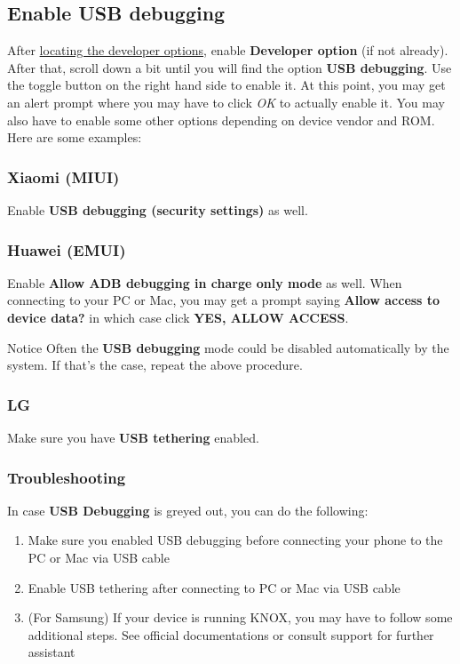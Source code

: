 \subsection{Enable USB debugging}\label{subsec:enable-usb-debugging}
After \hyperref[subsubsec:location-of-developer-options]{locating the developer options}, enable \textbf{Developer
option} (if not already). After that, scroll down a bit until you will find the option \textbf{USB debugging}. Use the
toggle button on the right hand side to enable it. At this point, you may get an alert prompt where you may have to
click \textit{OK} to actually enable it. You may also have to enable some other options depending on device vendor and
ROM. Here are some examples:

\subsubsection{Xiaomi (MIUI)}
Enable \textbf{USB debugging (security settings)} as well.

\subsubsection{Huawei (EMUI)}
Enable \textbf{Allow ADB debugging in charge only mode} as well. When connecting to your PC or Mac, you may get a prompt
saying \textbf{Allow access to device data?} in which case click \textbf{YES, ALLOW ACCESS}.

\begin{tip}{Notice}
    Often the \textbf{USB debugging} mode could be disabled automatically by the system. If that's the case, repeat the
    above procedure.
\end{tip}

\subsubsection{LG}
Make sure you have \textbf{USB tethering} enabled.

\subsubsection{Troubleshooting}
In case \textbf{USB Debugging} is greyed out, you can do the following:
\begin{enumerate}
    \item Make sure you enabled USB debugging before connecting your phone to the PC or Mac via USB cable
    \item Enable USB tethering after connecting to PC or Mac via USB cable
    \item (For Samsung) If your device is running KNOX, you may have to follow some additional steps. See official
    documentations or consult support for further assistant
\end{enumerate}


